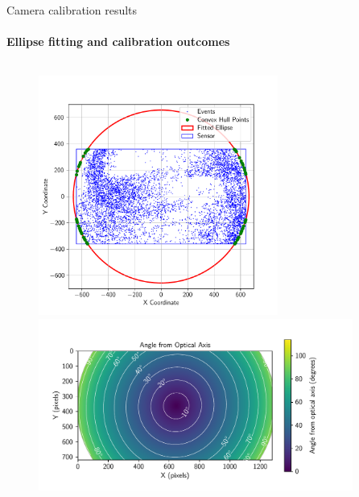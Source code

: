 \documentclass{beamer}
\begin{document}



\begin{frame}{Camera calibration results}
\framesubtitle{Ellipse fitting and calibration outcomes}

\begin{columns}[T]
    \begin{column}{0.49\textwidth}
        \vspace{-0.3cm}
        \begin{figure}
            \centering
            \includegraphics[width=0.70\textwidth]{./fig/pgfplot/build/ellipse_hull.pdf}
            
            \vspace{-0.2cm} %
            
            \includegraphics[width=0.92\textwidth]{./fig/pgfplot/build/evk4_viz.pdf}
            

\end{figure}
\end{column}
\end{columns}
\end{frame}
\end{document}
